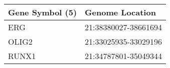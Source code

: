 \begin{tabular}{ll}
\toprule
Gene Symbol (5) &      Genome Location \\
\midrule
            ERG & 21:38380027-38661694 \\
          OLIG2 & 21:33025935-33029196 \\
          RUNX1 & 21:34787801-35049344 \\
\bottomrule
\end{tabular}
